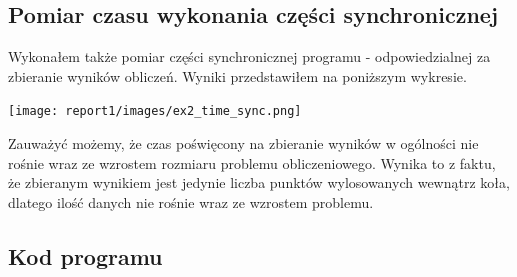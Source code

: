 \documentclass{article}
\begin{document}
        \subsection{Pomiar czasu wykonania części synchronicznej}
        Wykonałem także pomiar części synchronicznej programu - odpowiedzialnej za zbieranie wyników obliczeń. Wyniki przedstawiłem na poniższym wykresie. 
        \begin{center}
            \texttt{[image: report1/images/ex2\_time\_sync.png]}
        \end{center}
        Zauważyć możemy, że czas poświęcony na zbieranie wyników w ogólności nie rośnie wraz ze wzrostem rozmiaru problemu obliczeniowego. Wynika to z faktu, że zbieranym wynikiem jest jedynie liczba punktów wylosowanych wewnątrz koła, dlatego ilość danych nie rośnie wraz ze wzrostem problemu. 

        \subsection{Kod programu}
        
        
\end{document}
